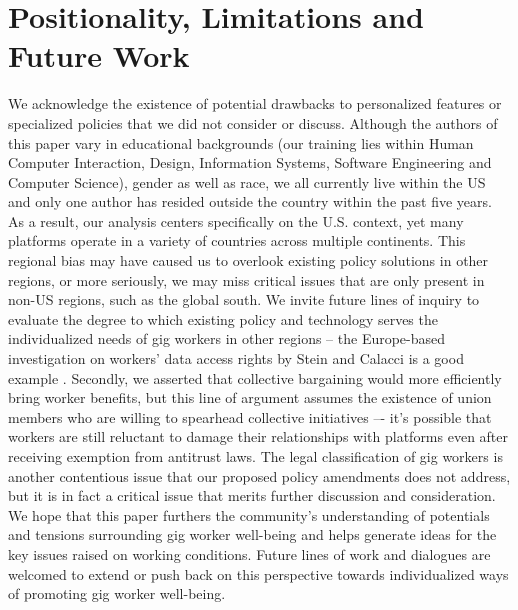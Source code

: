 \section{Positionality, Limitations and Future Work}
We acknowledge the existence of potential drawbacks to personalized features or specialized policies that we did not consider or discuss. Although the authors of this paper vary in educational backgrounds (our training lies within Human Computer Interaction, Design, Information Systems, Software Engineering and Computer Science), gender as well as race, we all currently live within the US and only one author has resided outside the country within the past five years. As a result, our analysis centers specifically on the U.S. context, yet many platforms operate in a variety of countries across multiple continents. This regional bias may have caused us to overlook existing policy solutions in other regions, or more seriously, we may miss critical issues that are only present in non-US regions, such as the global south. We invite future lines of inquiry to evaluate the degree to which existing policy and technology serves the individualized needs of gig workers in other regions -- the Europe-based investigation on workers' data access rights by Stein and Calacci is a good example \cite{stein2022workers}. Secondly, we asserted that collective bargaining would more efficiently bring worker benefits, but this line of argument assumes the existence of union members who are willing to spearhead collective initiatives –- it's possible that workers are still reluctant to damage their relationships with platforms even after receiving exemption from antitrust laws. The legal classification of gig workers is another contentious issue that our proposed policy amendments does not address, but it is in fact a critical issue that merits further discussion and consideration. We hope that this paper furthers the community's understanding of potentials and tensions surrounding gig worker well-being and helps generate ideas for the key issues raised on working conditions. Future lines of work and dialogues are welcomed to extend or push back on this perspective towards individualized ways of promoting gig worker well-being.